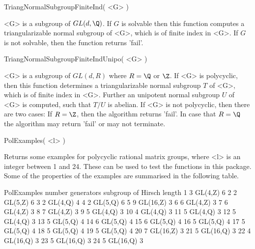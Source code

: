 
\> TriangNormalSubgroupFiniteInd( <G> )

<G> is  a subgroup of $GL(d,\Q)$. If $G$ is solvable then
this function computes a triangularizable normal subgroup of <G>,
which is of finite index in <G>. If $G$ is not solvable, then the 
function returns 'fail'. 

\> TriangNormalSubgroupFiniteIndUnipo( <G> )

<G> is  a subgroup of $GL(d,R)$ where $R=\Q$ or $\Z$.
If <G> is polycyclic, then 
this function determines a triangularizable normal subgroup $T$ of <G>,
which is of finite index in <G>. Further an unipotent normal 
subgroup $U$ of <G> is 
computed, such that $T/U$ is abelian.  
If <G> is not polycyclic, then there are two cases: If $R=\Z$,
then the algorithm returns 'fail'. In case that $R=\Q$ the algorithm may
return 'fail' or may not terminate.  


\> PolExamples( <l> )
 
Returns some examples for polycyclic rational matrix groups, where <l> 
is an integer
between 1 and 24. 
These can be used to test the functions in this package. 
Some of the
properties of the examples are summarised in the following table.

\begintt
PolExamples      number generators      subgroup of      Hirsch length
          1                      3           GL(4,Z)                 6 
          2                      2           GL(5,Z)                 6 
          3                      2           GL(4,Q)                 4 
          4                      2           GL(5,Q)                 6 
          5                      9          GL(16,Z)                 3 
          6                      6           GL(4,Z)                 3
          7                      6           GL(4,Z)                 3
          8                      7           GL(4,Z)                 3 
          9                      5           GL(4,Q)                 3
         10                      4           GL(4,Q)                 3 
         11                      5           GL(4,Q)                 3
         12                      5           GL(4,Q)                 3 
         13                      5           GL(5,Q)                 4
         14                      6           GL(5,Q)                 4 
         15                      6           GL(5,Q)                 4 
         16                      5           GL(5,Q)                 4
         17                      5           GL(5,Q)                 4 
         18                      5           GL(5,Q)                 4
         19                      5           GL(5,Q)                 4 
         20                      7          GL(16,Z)                 3 
         21                      5          GL(16,Q)                 3 
         22                      4          GL(16,Q)                 3
         23                      5          GL(16,Q)                 3 
         24                      5          GL(16,Q)                 3 

